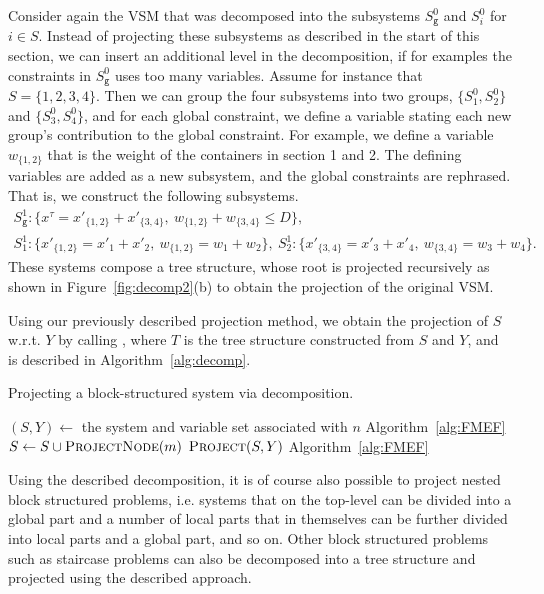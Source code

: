 \documentclass{llncs}
\newcommand{\trt}[1]{\texttt{#1}}
\begin{document}
Consider again the VSM that was decomposed into the subsystems $S^0_\trt{g}$ and $S^0_i$ for $i\in S$. Instead of projecting these subsystems as described in the start of this section, we can insert an additional level in the decomposition, if for examples the constraints in $S^0_\texttt{g}$ uses too many variables. 
Assume for instance that $S=\{1,2,3,4\}$. Then we can group the four subsystems into two groups, $\{S^0_1, S^0_2\}$ and $\{S^0_3, S^0_4\}$, and for each global constraint, we define a variable stating each new group's contribution to the global constraint. For example, we define a variable $w_{\{1,2\}}$ that is the weight of the containers in section 1 and 2. The defining variables are added as a new subsystem, and the global constraints are rephrased. That is, we construct the following subsystems.
\vspace{-1mm}
\footnotesize{
\[
\begin{gathered}
S_\trt{g}^1 :\{ x^\tau = x'_{\{1,2\}} + x'_{\{3,4\}},\: w_{\{1,2\}} + w_{\{3,4\}} \leq D \},\\   
S^1_1				:\{ x'_{\{1,2\}} = x'_{1} + x'_{2},\: w_{\{1,2\}} = w_{1} + w_{2}\},\:
S^1_2				:\{ x'_{\{3,4\}} = x'_{3} + x'_{4},\: w_{\{3,4\}} = w_{3} + w_{4}\}. 
\end{gathered}
\]}
\normalsize{These systems compose a tree structure, whose root is projected recursively as shown in Figure~\ref{fig:decomp2}(b) to obtain the projection of the original VSM.}

Using our previously described projection method, we obtain the projection of $S$ w.r.t. $Y$ by calling , where $T$ is the tree structure constructed from $S$ and $Y$, and  is described in Algorithm~\ref{alg:decomp}.
\begin{algorithm}[b!]
\caption{{Projecting a block-structured system via decomposition.}}
\label{alg:decomp}
\begin{algorithmic}
	\State $(S,Y)\gets$ the system and variable set associated with $n$
		\State \Return {}\Comment Algorithm~\ref{alg:FMEF}
	\Else
			\State $S \gets S\cup \Call{ProjectNode}{m}$ 
		\EndFor
		\State \Return $\Call{Project}{S, Y}$ \Comment Algorithm~\ref{alg:FMEF}
	\EndIf
\EndFunction
\end{algorithmic}
\end{algorithm}
Using the described decomposition, it is of course also possible to project nested block structured problems, i.e. systems that on the top-level can be divided into a global part and a number of local parts that in themselves can be further divided into local parts and a global part, and so on. Other block structured problems such as staircase problems can also be decomposed into a tree structure and projected using the described approach. 
\end{document}
